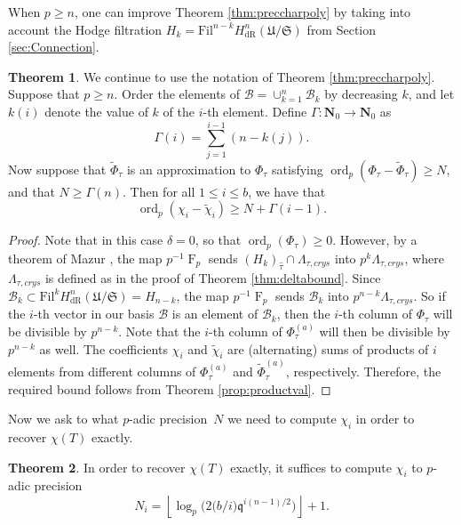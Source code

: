 \documentclass[a4paper,11pt]{article}
\numberwithin{equation}{section}
\providecommand{\floor}[1]{\left\lfloor#1\right\rfloor}   %
\newcommand{\NN}{\mathbf{N}} %
\DeclareMathOperator{\ord}{ord}          %
\DeclareMathOperator{\Frob}{F}           %
\providecommand{\HdR}{H_{\text{dR}}}    %
\providecommand{\cB}{\mathcal{B}} %
\theoremstyle{definition}
\newtheorem{thm}{Theorem}[section]
\begin{document}
When $p \geq n$, one can improve Theorem \ref{thm:preccharpoly} by taking into account the Hodge
filtration $H_k=\mbox{Fil}^{n-k} \HdR^{n}(\mathfrak{U}/\mathfrak{S})$ from Section \ref{sec:Connection}.

\begin{thm} \label{thm:pgeqn}
We continue to use the notation of Theorem \ref{thm:preccharpoly}. Suppose that $p \geq n$. 
Order the elements of $\cB = \cup_{k=1}^n \cB_k$ by decreasing $k$, and let $k(i)$ denote
the value of $k$ of the $i$-th element. Define $\Gamma: \NN _0\rightarrow \NN_0$ as
\[
\Gamma(i) = \sum_{j=1}^{i-1} (n-k(j)).
\]
Now suppose that $\tilde{\Phi}_{\tau}$ is an approximation to $\Phi_{\tau}$ satisfying
$\ord_p (\Phi_{\tau}-\tilde{\Phi}_{\tau}) \geq N$, and that $N \geq \Gamma(n)$. Then for all 
$1 \leq i \leq b$, we have that 
\[
\ord_p(\chi_i-\tilde{\chi}_i) \geq N + \Gamma(i-1).
\]
\end{thm}
 
\begin{proof} 
Note that in this case $\delta=0$, so that $\ord_p(\Phi_{\tau}) \geq 0$. However, by a theorem of 
Mazur \cite{Mazur1972}, the map $p^{-1} \Frob_p$ sends $(H_k)_{\hat{\tau}} \cap \Lambda_{\tau,crys}$ 
into $p^k \Lambda_{\tau,crys}$, where $\Lambda_{\tau,crys}$ is defined as in the proof of Theorem \ref{thm:deltabound}. 
Since $\cB_k \subset \mbox{Fil}^{k} \HdR^{n}(\mathfrak{U}/\mathfrak{S}) = H_{n-k}$, the map $p^{-1} \Frob_p$ sends
$\cB_k$ into $p^{n-k} \Lambda_{\tau,crys}$. So if the $i$-th vector in our basis $\cB$ is an element of $\cB_k$, 
then the $i$-th column of $\Phi_{\tau}$ will be divisible by $p^{n-k}$. Note that the $i$-th column of $\Phi_{\tau}^{(a)}$
will then be divisible by $p^{n-k}$ as well. The coefficients $\chi_i$ and $\tilde{\chi}_i$ are (alternating) sums of
products of $i$ elements from different columns of $\Phi_{\tau}^{(a)}$ and $\tilde{\Phi}_{\tau}^{(a)}$, respectively.
Therefore, the required bound follows from Theorem \ref{prop:productval}. 
\end{proof}

Now we ask to what $p$-adic precision~$N$ we need to compute $\chi_i$ in order to recover $\chi(T)$ exactly.

\begin{thm} \label{thm:N0}
In order to recover $\chi(T)$ exactly, it suffices to compute 
$\chi_i$ to $p$-adic precision 
\begin{equation*}
N_i = \floor{\log_p \bigl( 2 \bigl( b/i \bigr) \mathfrak{q}^{i (n-1) / 2} \bigr)}+1.
\end{equation*}
\end{thm}
\end{document}
